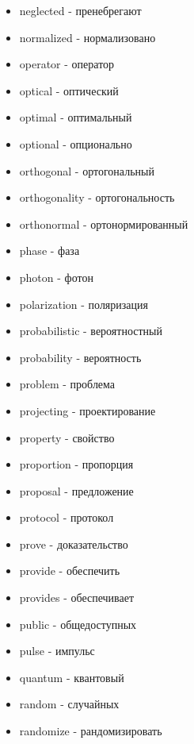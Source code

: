 \begin{multicols}{2}
\begin{itemize}
		\item neglected - пренебрегают
		
		\item normalized - нормализовано
		
		\item operator - оператор
		\item optical - оптический
		\item optimal - оптимальный
		
		\item optional - опционально
		
		\item orthogonal - ортогональный
		\item orthogonality - ортогональность
		\item orthonormal - ортонормированный
		
		\item phase - фаза
		\item photon - фотон
		
		\item polarization - поляризация
		
		
		\item probabilistic - вероятностный
		\item probability - вероятность
		\item problem - проблема
		
		\item projecting - проектирование
		
		\item property - свойство
		\item proportion - пропорция
		\item proposal - предложение
		
		\item protocol - протокол
		
		\item prove - доказательство
		
		\item provide - обеспечить
		\item provides - обеспечивает
		
		\item public - общедоступных
		\item pulse - импульс
		
		\item quantum - квантовый
		\item random - случайных
		\item randomize - рандомизировать
		

\end{itemize}
\end{multicols}
